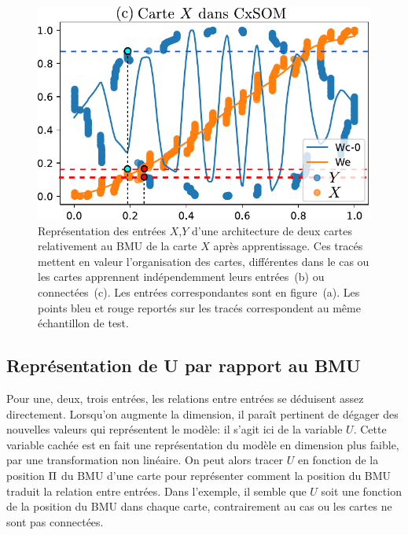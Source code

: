 \begin{figure}
\begin{minipage}{0.38\textwidth}
\includegraphics[width=\textwidth]{weights_2som.pdf}
\end{minipage}
\label{fig:inputs}
\caption{Représentation des entrées $X$,$Y$ d'une architecture de deux cartes relativement au BMU de la carte $X$ après apprentissage. Ces tracés mettent en valeur l'organisation des cartes, différentes dans le cas ou les cartes apprennent indépendemment leurs entrées~(b) ou connectées~(c). Les entrées correspondantes sont en figure~(a). Les points bleu et rouge reportés sur les tracés correspondent au même échantillon de test.}
\end{figure}

\subsection{Représentation de U par rapport au BMU}

Pour une, deux, trois entrées, les relations entre entrées se déduisent assez directement. Lorsqu'on augmente la dimension, il paraît pertinent de dégager des nouvelles valeurs qui représentent le modèle: il s'agit ici de la variable $U$. Cette variable cachée est en fait une représentation du modèle en dimension plus faible, par une transformation non linéaire. On peut alors tracer $U$ en fonction de la position $\Pi$ du BMU d'une carte pour représenter comment la position du BMU traduit la relation entre entrées. Dans l'exemple, il semble que $U$ soit une fonction de la position du BMU dans chaque carte, contrairement au cas ou les cartes ne sont pas connectées. 

